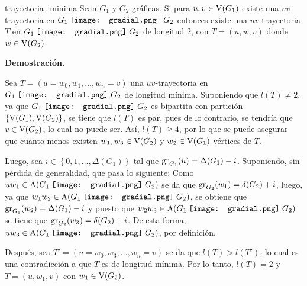 \documentclass[fleqn, 11pt]{beamer}
\newcommand{\gradial}{\hspace{0.9mm} \texttt{[image: gradial.png]} \hspace{1mm}}
\begin{document}
    \begin{teorema}[beforeafter skip = 4mm]{}{trayectoria_minima}
        Sean $ G_1 $ y $ G_2 $ gráficas. Si para $ u,v \in \textnormal{V}(G_1) $ existe una $ uv $-trayectoria en $ G_1 \gradial G_2 $ entonces existe una $ uv $-trayectoria $ T $ en $ G_1 \gradial G_2 $ de longitud 2, con $ T = (u,w,v) $ donde $ w \in \textnormal{V}(G_2) $.
        
        \tcblower

        \textbf{Demostración.} \vspace{3mm}

        Sea $ T = \left( u = w_0, w_1, \ldots, w_n = v \right) $ una $ uv $-trayectoria en $ G_1 \gradial G_2 $ de longitud mínima. Suponiendo que $ l(T) \neq 2 $, ya que $ G_1 \gradial G_2 $ es bipartita con partición $ \left\lbrace \textnormal{V}(G_1), \textnormal{V}(G_2) \right\rbrace $, se tiene que $ l(T) $ es par, pues de lo contrario, se tendría que $ v \in \textnormal{V}(G_2) $, lo cual no puede ser. Así, $ l (T) \geq 4 $, por lo que se puede asegurar que cuanto menos existen $ w_1, w_3 \in \textnormal{V}(G_2) $ y $ w_2 \in \textnormal{V}(G_1) $ vértices de $ T $. \vspace{2mm}

        Luego, sea $ i \in \left\lbrace 0, 1, \ldots, \Delta(G_1) \right\rbrace $ tal que $ \textnormal{gr}_{G_1}(u) = \Delta(G_1) - i $. Suponiendo, sin pérdida de generalidad, que pasa lo siguiente: Como $ uw_1 \in \textnormal{A}(G_1 \gradial G_2) $ se da que $ \textnormal{gr}_{G_2}(w_1) = \delta(G_2) + i $, luego, ya que $ w_1w_2 \in \textnormal{A}(G_1 \gradial G_2) $, se obtiene que $ \textnormal{gr}_{G_1}(w_2) = \Delta(G_1) - i $ y puesto que $ w_2w_3 \in \textnormal{A}(G_1 \gradial G_2) $ se tiene que $ \textnormal{gr}_{G_2}(w_3) = \delta(G_2) + i $. De esta forma, $ uw_3 \in \textnormal{A}(G_1 \gradial G_2) $, por definición. \vspace{2mm}

        Después, sea $ T' = \left( u = w_0, w_3, \ldots, w_n = v \right) $ se da que $ l(T) > l(T') $, lo cual es una contradicción a que $ T $ es de longitud mínima. Por lo tanto, $ l(T) = 2 $ y $ T = (u,w_1,v) $ con $ w_1 \in \textnormal{V}(G_2) $.
    \end{teorema}
\end{document}
